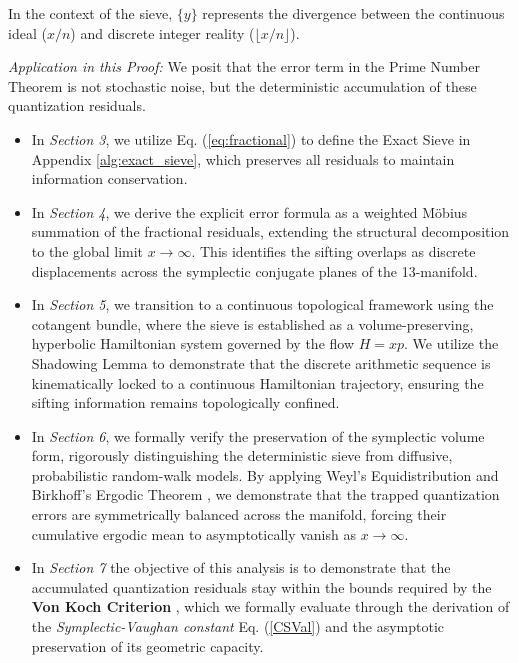\documentclass[sn-mathphys-num, pdflatex, referee]{sn-jnl}
\begin{document}
In the context of the sieve, $\{y\}$ represents the divergence between the continuous ideal ($x/n$) and discrete integer reality ($\lfloor x/n \rfloor$).

\textit{Application in this Proof:} We posit that the error term in the Prime Number Theorem is not stochastic noise, but the deterministic accumulation of these quantization residuals.

\begin{itemize}
    \item In \textit{Section 3}, we utilize Eq. (\ref{eq:fractional}) to define the Exact Sieve in Appendix \ref{alg:exact_sieve}, which preserves all residuals to maintain information conservation.
    \item In \textit{Section 4}, we derive the explicit error formula as a weighted M\"{o}bius summation of the fractional residuals, extending the structural decomposition to the global limit $x \to \infty$. This identifies the sifting overlaps as discrete displacements across the symplectic conjugate planes of the 13-manifold.
    \item In \textit{Section 5}, we transition to a continuous topological framework using the cotangent bundle, where the sieve is established as a volume-preserving, hyperbolic Hamiltonian system governed by the flow $H=xp$. We utilize the Shadowing Lemma to demonstrate that the discrete arithmetic sequence is kinematically locked to a continuous Hamiltonian trajectory, ensuring the sifting information remains topologically confined.
    \item In \textit{Section 6}, we formally verify the preservation of the symplectic volume form, rigorously distinguishing the deterministic sieve from diffusive, probabilistic random-walk models. By applying Weyl’s Equidistribution \cite{weyl} and Birkhoff’s Ergodic Theorem \cite{birkhoff1931proof}, we demonstrate that the trapped quantization errors are symmetrically balanced across the manifold, forcing their cumulative ergodic mean to asymptotically vanish as $x \to \infty$.
    \item In \textit{Section 7} the objective of this analysis is to demonstrate that the accumulated quantization residuals stay within the bounds required by the \textbf{Von Koch Criterion} \cite{vonkoch}, which we formally evaluate  through the derivation of the \textit{Symplectic-Vaughan constant} Eq. (\ref{CSVal}) and the asymptotic preservation of its geometric capacity.
\end{itemize}
\end{document}
